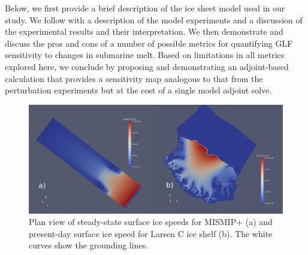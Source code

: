 \documentclass[review,oneside]{igs}
\begin{document}

Below, we first provide a brief description of the ice sheet model used in our study. We follow with a description of the model experiments and a discussion of the experimental results and their interpretation. We then demonstrate and discuss the pros and cons of a number of possible metrics for quantifying GLF sensitivity to changes in submarine melt. Based on limitations in all metrics explored here, we conclude by proposing and demonstrating an adjoint-based calculation that provides a sensitivity map analogous to that from the \cite{reese2018} perturbation experiments but at the cost of a single model adjoint solve.

\begin{figure}
\centering
\includegraphics[width=1\linewidth]{figs/fig1.pdf}
\caption{Plan view of steady-state surface ice speeds for MISMIP+ (a) and present-day surface ice speed for Larsen C ice shelf (b). The white curves show the grounding lines.}
\label{fig1}
\end{figure}
\end{document}
